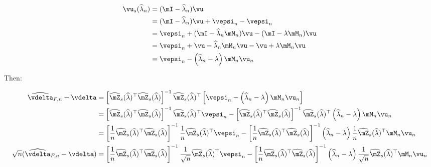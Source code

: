 \documentclass[english,12pt]{book}\usepackage[]{graphicx}\usepackage[]{xcolor}
\begin{document}
\begin{subappendices}
\begin{equation}
  \begin{aligned}
    \vu_s(\widehat{\lambda}_n) & = (\mI - \widehat{\lambda}_n)\vu \\
                               & = (\mI - \widehat{\lambda}_n)\vu + \vepsi_n - \vepsi_n \\
                               & = \vepsi_n  + (\mI - \widehat{\lambda}_n\mM_n)\vu - (\mI - \lambda\mM_n)\vu \\
                               & = \vepsi_n  + \vu  - \widehat{\lambda}_n\mM_n\vu - \vu + \lambda\mM_n\vu \\
                               & = \vepsi_n - \left(\widehat{\lambda}_n- \lambda\right)\mM_n\vu_n
  \end{aligned}
\end{equation}

Then:

\begin{equation}
  \begin{aligned}
    \widehat{\vdelta}_{F, n} - \vdelta & = \left[\widehat{\mZ}_s(\widehat{\lambda})^\top\widehat{\mZ}_s(\widehat{\lambda})\right]^{-1}\widehat{\mZ}_s(\widehat{\lambda})^\top\left[\vepsi_n - \left(\widehat{\lambda}_n- \lambda\right)\mM_n\vu_n\right] \\
     & = \left[\widehat{\mZ}_s(\widehat{\lambda})^\top\widehat{\mZ}_s(\widehat{\lambda})\right]^{-1}\widehat{\mZ}_s(\widehat{\lambda})^\top\vepsi_n - \left[\widehat{\mZ}_s(\widehat{\lambda})^\top\widehat{\mZ}_s(\widehat{\lambda})\right]^{-1}\widehat{\mZ}_s(\widehat{\lambda})^\top\left(\widehat{\lambda}_n- \lambda\right)\mM_n\vu_n \\
     & = \left[\frac{1}{n}\widehat{\mZ}_s(\widehat{\lambda})^\top\widehat{\mZ}_s(\widehat{\lambda})\right]^{-1}\frac{1}{n}\widehat{\mZ}_s(\widehat{\lambda})^\top\vepsi_n - \left[\frac{1}{n}\widehat{\mZ}_s(\widehat{\lambda})^\top\widehat{\mZ}_s(\widehat{\lambda})\right]^{-1}\left(\widehat{\lambda}_n- \lambda\right)\frac{1}{n}\widehat{\mZ}_s(\widehat{\lambda})^\top\mM_n\vu_n \\
 \sqrt{n} (\widehat{\vdelta}_{F, n} - \vdelta)   & = \left[\frac{1}{n}\widehat{\mZ}_s(\widehat{\lambda})^\top\widehat{\mZ}_s(\widehat{\lambda})\right]^{-1}\frac{1}{\sqrt{n}}\widehat{\mZ}_s(\widehat{\lambda})^\top\vepsi_n - \left[\frac{1}{n}\widehat{\mZ}_s(\widehat{\lambda})^\top\widehat{\mZ}_s(\widehat{\lambda})\right]^{-1}\left(\widehat{\lambda}_n- \lambda\right)\frac{1}{\sqrt{n}}\widehat{\mZ}_s(\widehat{\lambda})^\top\mM_n\vu_n
  \end{aligned}
\end{equation}


\end{subappendices}
\end{document}
